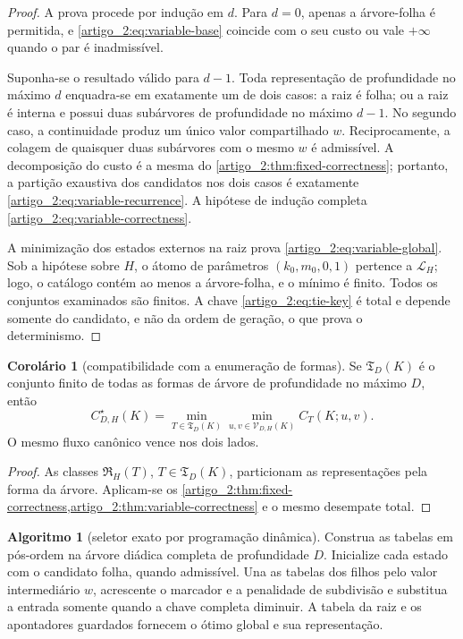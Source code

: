 \documentclass[12pt,a4paper]{article}
\theoremstyle{preciso}
\theoremstyle{definition}
\newcommand{\Library}{\mathcal{L}}
\newcommand{\Representations}{\mathfrak{R}}
\newcommand{\Trees}{\mathfrak{T}}
\newcommand{\Values}{\mathcal{V}}
\theoremstyle{preciso}
\theoremstyle{preciso}
\theoremstyle{preciso}
\theoremstyle{preciso}
\newtheorem{corollary}[teorema]{Corolário}
\theoremstyle{definition}
\theoremstyle{preciso}
\newtheorem{algorithm}[teorema]{Algoritmo}
\theoremstyle{definition}
\theoremstyle{preciso}
\theoremstyle{preciso}
\theoremstyle{definition}
\begin{document}
\begin{proof}
A prova procede por indução em $d$. Para $d=0$, apenas a árvore-folha é permitida,
e \eqref{artigo_2:eq:variable-base} coincide com o seu custo ou vale $+\infty$ quando o
par é inadmissível.

Suponha-se o resultado válido para $d-1$. Toda representação de profundidade no máximo
$d$ enquadra-se em exatamente um de dois casos: a raiz é folha; ou a raiz é interna
e possui duas subárvores de profundidade no máximo $d-1$. No segundo caso, a
continuidade produz um único valor compartilhado $w$. Reciprocamente, a
colagem de quaisquer duas subárvores com o mesmo $w$ é admissível. A
decomposição do custo é a mesma do \cref{artigo_2:thm:fixed-correctness}; portanto, a
partição exaustiva dos candidatos nos dois casos é exatamente
\eqref{artigo_2:eq:variable-recurrence}. A hipótese de indução completa
\eqref{artigo_2:eq:variable-correctness}.

A minimização dos estados externos na raiz prova \eqref{artigo_2:eq:variable-global}. Sob a
hipótese sobre $H$, o átomo de parâmetros $(k_0,m_0,0,1)$ pertence a
$\Library_H$; logo, o catálogo contém ao menos a árvore-folha, e o mínimo é
finito. Todos os conjuntos examinados são finitos. A chave
\eqref{artigo_2:eq:tie-key} é total e depende somente do candidato, e não da ordem de
geração, o que prova o determinismo.
\end{proof}

\begin{corollary}[compatibilidade com a enumeração de formas]\label{map:artigo_2:7.3}
\label{artigo_2:cor:shape-enumeration}
Se $\Trees_D(K)$ é o conjunto finito de todas as formas de árvore de
profundidade no máximo $D$, então
\begin{equation}
 C_{D,H}^{\star}(K)
 =\min_{T\in\Trees_D(K)}
   \min_{u,v\in\Values_{D,H}(K)}C_T(K;u,v).
 \label{artigo_2:eq:shape-equivalence}
\end{equation}
O mesmo fluxo canônico vence nos dois lados.
\end{corollary}

\begin{proof}
As classes $\Representations_H(T)$, $T\in\Trees_D(K)$, particionam as
representações pela forma da árvore. Aplicam-se os
\cref{artigo_2:thm:fixed-correctness,artigo_2:thm:variable-correctness} e o mesmo desempate
total.
\end{proof}

\begin{algorithm}[seletor exato por programação dinâmica]\label{map:artigo_2:7.4}
\label{artigo_2:alg:variable-tree}
Construa as tabelas em pós-ordem na árvore diádica completa de profundidade
$D$. Inicialize cada estado com o candidato folha, quando admissível. Una as
tabelas dos filhos pelo valor intermediário $w$, acrescente o marcador e a
penalidade de subdivisão e substitua a entrada somente quando a chave completa
diminuir. A tabela da raiz e os apontadores guardados fornecem o ótimo global
e sua representação.
\end{algorithm}
\end{document}

